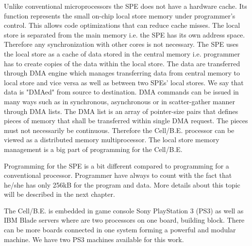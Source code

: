 \par
Unlike conventional microprocessors the SPE does not have a hardware cache.
Its function represents the small on-chip local store memory under programmer's control.
This allows code optimizations that can reduce cache misses.
The local store is separated from the main memory i.e. the SPE has its own address space.
Therefore any synchronization with other cores is not necessary.
The SPE uses the local store as a cache of data stored in the central memory i.e. programmer has to create copies of the data within the local store.
The data are transferred through DMA engine which manages transferring data from central memory to local store and vice versa as well as between two SPEs' local stores.
We say that data is "DMAed" from source to destination.
DMA commands can be issued in many ways such as in synchronous, asynchronous or in scatter-gather manner through DMA lists.
The DMA list is an array of pointer-size pairs that defines pieces of memory that shall be transferred within single DMA request.
The pieces must not necessarily be continuous.
Therefore the \mbox{Cell/B.E.} processor can be viewed as a distributed memory multiprocessor.
The local store memory management is a big part of programming for the \mbox{Cell/B.E.}

\par
Programming for the SPE is a bit different compared to programming for a conventional processor.
Programmer have always to count with the fact that he/she has only 256kB for the program and data.
More details about this topic will be described in the next chapter.

\par
The \mbox{Cell/B.E.} is embedded in game console Sony PlayStation 3 (PS3) as well as IBM Blade servers where are two processors on one board, building block.
There can be more boards connected in one system forming a powerful and modular machine.
We have two PS3 machines available for this work.

